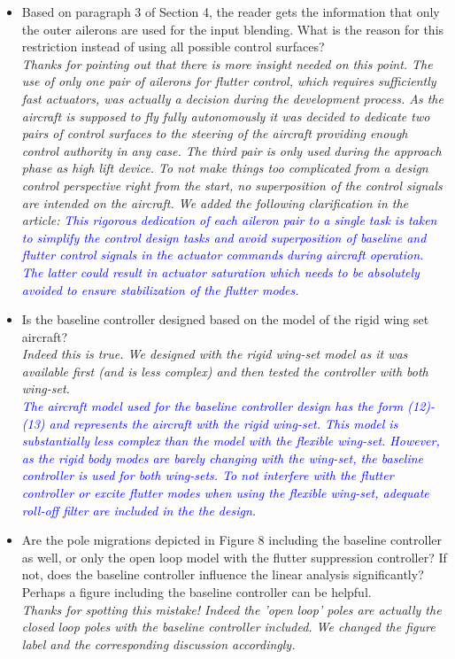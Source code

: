 \documentclass{article}
\begin{document}
\begin{itemize}
\item Based on paragraph 3 of Section 4, the reader gets the information that only the outer ailerons are used for the input blending. What is the reason for this restriction instead of using all possible control surfaces?\\
\textit{Thanks for pointing out that there is more insight needed on this point. The use of only one pair of ailerons for flutter control, which requires sufficiently fast actuators, was actually a decision during the development process. As the aircraft is supposed to fly fully autonomously it was decided to dedicate two pairs of control surfaces to the steering of the aircraft providing enough control authority in any case. The third pair is  only used  during the approach phase as high lift device. To not make things too complicated from a design control perspective right from the start, no superposition of the control signals are intended on the aircraft. We added the following clarification in the article:}
\textit{\textcolor{blue}{
This rigorous dedication of each aileron pair to a single task is taken to simplify the control design tasks and avoid superposition of baseline and flutter control signals in the actuator commands during  aircraft operation. The latter could result in actuator saturation which needs to be absolutely avoided to ensure stabilization of the flutter modes.
}}


\item Is the baseline controller designed based on the model of the rigid wing set aircraft?\\ 
\textit{Indeed this is true. We designed with the rigid wing-set model as it was available first (and is less complex) and then tested the controller with both wing-set.}\\
\textit{\textcolor{blue}{
The aircraft model used for the baseline controller design has the form (12)-(13)  and represents the aircraft with the rigid wing-set.
This model is substantially less complex than the model with the flexible wing-set. However, as the rigid body modes are barely changing with the wing-set, the baseline controller is used for both wing-sets. To not interfere with the flutter controller or excite flutter modes when using the flexible wing-set, adequate roll-off filter are included in the the design.
}}

\item  Are the pole migrations depicted in Figure 8 including the baseline controller as well, or only the open loop model with the flutter suppression controller? If not, does the baseline controller influence the linear analysis significantly? Perhaps a figure including the baseline controller can be helpful.\\
\textit{
	Thanks for spotting this mistake! Indeed the 'open loop' poles are actually the closed loop poles with the baseline controller included. We changed the figure label and the corresponding discussion accordingly.
}


\end{itemize}
\end{document}
